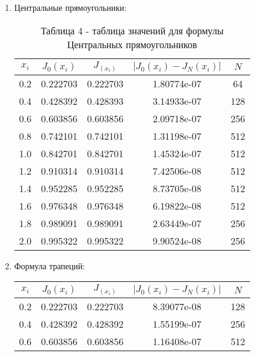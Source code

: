\documentclass[a4paper,12pt]{article}
\begin{document}
{\begin{enumerate}[label = \arabic*.]
{\begin{table}[h]
        \end{table}
        \newpage
    }
    \item {Центральные прямоугольники:
        \begin{table}[h]
          \centering
          \begin{tabular}{|c|c|c|c|c|}
            \hline
            $x_i$ & $J_0(x_i)$ & $J_(x_i)$ & $\left|J_0(x_i) - J_N(x_i)\right|$ & $N$\\
            \hline
            0.2 &  0.222703 &  0.222703 & 1.80774e-07 & 64\\
            \hline
            0.4 &  0.428392 &  0.428393 & 3.14933e-07 & 128\\
            \hline
            0.6 &  0.603856 &  0.603856 & 2.09718e-07 & 256\\
            \hline
            0.8 &  0.742101 &  0.742101 & 1.31198e-07 & 512\\
            \hline
            1.0 &  0.842701 &  0.842701 & 1.45324e-07 & 512\\
            \hline
            1.2 &  0.910314 &  0.910314 & 7.42506e-08 & 512\\
            \hline
            1.4 &  0.952285 &  0.952285 & 8.73705e-08 & 512\\
            \hline
            1.6 &  0.976348 &  0.976348 & 6.19822e-08 & 512\\
            \hline
            1.8 &  0.989091 &  0.989091 & 2.63449e-07 & 256\\
            \hline
            2.0 &  0.995322 &  0.995322 & 9.90524e-08 & 256\\
            \hline
          \end{tabular}
          \caption*{\small{Таблица 4 - таблица значений для формулы Центральных прямоугольников}}
        \end{table}
    }
    \item {Формула трапеций:
        \begin{table}[h]
          \centering
          \begin{tabular}{|c|c|c|c|c|}
            \hline
            $x_i$ & $J_0(x_i)$ & $J_(x_i)$ & $\left|J_0(x_i) - J_N(x_i)\right|$ & $N$\\
            \hline
            0.2 &  0.222703 &  0.222703 & 8.39077e-08 & 128\\
            \hline
            0.4 &  0.428392 &  0.428392 & 1.55199e-07 & 256\\
            \hline
            0.6 &  0.603856 &  0.603856 & 1.16408e-07 & 512\\

\end{tabular}
\end{table}}
\end{enumerate}}
\end{document}
